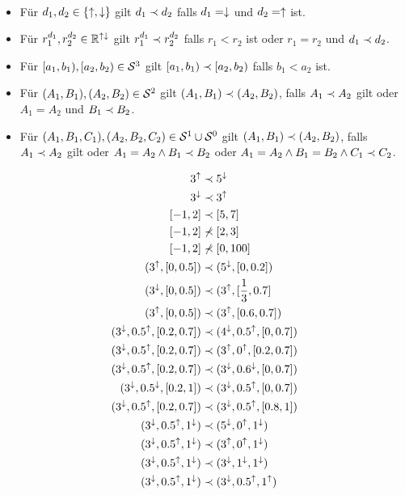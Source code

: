 \begin{dfn}\ 
    \begin{itemize}
        \item Für $d_1,d_2 \in \{\uparrow, \downarrow\}$ gilt $d_1 \prec d_2$ falls $d_1 = \downarrow$ und $d_2 = \uparrow$ ist. 
        \item Für $r_1^{d_1},r_2^{d_2} \in \mathbb{R}^{{\uparrow \downarrow}}$ gilt $r_1^{d_1} \prec r_2^{d_2}$ falls $r_1 < r_2$ ist oder $r_1 = r_2$ und $d_1 \prec d_2$.
        \item Für $[a_1,b_1), [a_2,b_2) \in \mathcal{S}^3$ gilt $[a_1,b_1) \prec [a_2,b_2)$ falls $b_1 < a_2$ ist.
        \item Für $(A_1,B_1), (A_2,B_2) \in \mathcal{S}^2$ gilt $(A_1,B_1) \prec (A_2,B_2)$, falls $A_1 \prec A_2$ gilt oder $A_1 = A_2$ und $B_1 \prec B_2$.
        \item Für $(A_1,B_1,C_1), (A_2,B_2,C_2) \in \mathcal{S}^1 \cup \mathcal{S}^0$ gilt $(A_1,B_1) \prec (A_2,B_2)$, falls $A_1 \prec A_2$ gilt oder $A_1 = A_2 \land B_1 \prec B_2$ oder $A_1 = A_2 \land B_1 = B_2 \land C_1 \prec C_2$.
    \end{itemize}
\end{dfn}

\begin{bsp}
    \begin{align*}
        3^{\uparrow} &\prec 5^{\downarrow}\\
        3^{\downarrow} &\prec 3^{\uparrow}\\
        [-1,2] &\prec [5,7]\\
        [-1,2] &\nprec [2,3]\\
        [-1,2] &\nprec [0,100]\\
        (3^{\uparrow}, [0,0.5]) &\prec (5^{\downarrow}, [0,0.2])\\
        (3^{\downarrow}, [0,0.5]) &\prec (3^{\uparrow}, [\frac{1}{3}, 0.7]\\
        (3^{\uparrow}, [0,0.5]) &\prec (3^{\uparrow}, [0.6,0.7])\\
        (3^{\downarrow},0.5^{\uparrow},[0.2, 0.7]) &\prec (4^{\downarrow},0.5^{\uparrow},[0, 0.7])\\
        (3^{\downarrow},0.5^{\uparrow},[0.2, 0.7]) &\prec (3^{\uparrow},0^{\uparrow},[0.2, 0.7])\\
        (3^{\downarrow},0.5^{\uparrow},[0.2, 0.7]) &\prec (3^{\downarrow},0.6^{\downarrow},[0, 0.7])\\
        (3^{\downarrow},0.5^{\downarrow},[0.2, 1]) &\prec (3^{\downarrow},0.5^{\uparrow},[0, 0.7])\\
        (3^{\downarrow},0.5^{\uparrow},[0.2, 0.7]) &\prec (3^{\downarrow},0.5^{\uparrow},[0.8, 1])\\
        (3^{\downarrow},0.5^{\uparrow},1^{\downarrow}) &\prec (5^{\downarrow},0^{\uparrow},1^{\downarrow})\\
        (3^{\downarrow},0.5^{\uparrow},1^{\downarrow}) &\prec (3^{\uparrow},0^{\uparrow},1^{\downarrow})\\
        (3^{\downarrow},0.5^{\uparrow},1^{\downarrow}) &\prec (3^{\downarrow},1^{\downarrow},1^{\downarrow})\\
        (3^{\downarrow},0.5^{\uparrow},1^{\downarrow}) &\prec (3^{\downarrow},0.5^{\uparrow},1^{\uparrow})
    \end{align*}
\end{bsp}


